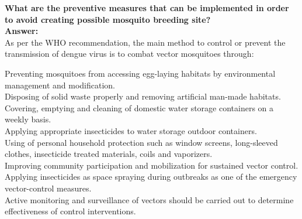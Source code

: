 \documentclass[11pt]{exam}
\begin{document}
\begin{questions}
%
%
%
%
%


\newpage
\question
\label{10. Dengue: Prevention and Control }
\textbf{What are the preventive measures that can be implemented in order to avoid creating possible mosquito breeding site?} \\
\textbf{Answer:} \\
As per the WHO recommendation, the main method to control or prevent the transmission of dengue virus is to combat vector mosquitoes through:

Preventing mosquitoes from accessing egg-laying habitats by environmental management and modification. \\
Disposing of solid waste properly and removing artificial man-made habitats.\\
Covering, emptying and cleaning of domestic water storage containers on a weekly basis.\\
Applying appropriate insecticides to water storage outdoor containers.\\
Using of personal household protection such as window screens, long-sleeved clothes, insecticide treated materials, coils and vaporizers.\\
Improving community participation and mobilization for sustained vector control.\\
Applying insecticides as space spraying during outbreaks as one of the emergency vector-control measures.\\
Active monitoring and surveillance of vectors should be carried out to determine effectiveness of control interventions.\\




\end{questions}
\end{document}
